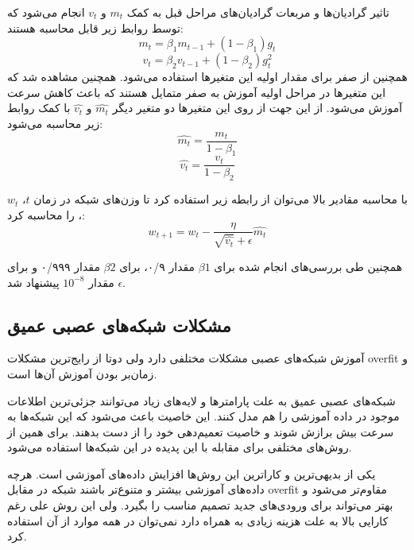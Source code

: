 تاثیر گرادیان‌ها و مربعات گرادیان‌های مراحل قبل به کمک $m_t$ و $v_t$ انجام
می‌شود که توسط روابط زیر قابل محاسبه هستند:
\begin{equation}
    m_t = \beta_1 m_{t-1} + (1 - \beta_1) g_t
\end{equation}
\begin{equation}
    v_t = \beta_2 v_{t-1} + (1 - \beta_2) g_t^2
\end{equation}
همچنین از صفر برای مقدار اولیه این متغیرها استفاده می‌شود. همچنین مشاهده شد که
این متغیرها در مراحل اولیه آموزش به صفر متمایل هستند که باعث کاهش سرعت آموزش
می‌شود. از این جهت از روی این متغیرها دو متغیر دیگر $\hat{m_t}$ و $\hat{v_t}$ با
کمک روابط زیر محاسبه می‌شود:
\begin{equation}
    \hat{m_t} = \frac{m_t}{1 - \beta_1}
\end{equation}
\begin{equation}
    \hat{v_t} = \frac{v_t}{1 - \beta_2}
\end{equation}

با محاسبه مقادیر بالا می‌توان از رابطه زیر استفاده کرد تا وزن‌های شبکه در زمان
$t$، $w_t$، را محاسبه کرد:
\begin{equation}
    w_{t+1} = w_{t} - \frac{\eta}{\sqrt{\hat{v_t}} + \epsilon} \hat{m_t}
\end{equation}

همچنین طی بررسی‌های انجام شده برای $\beta1$ مقدار ۰/۹، برای $\beta2$ مقدار ۰/۹۹۹
و برای $\epsilon$ مقدار $10^{-8}$ پیشنهاد شد.

\subsection{مشکلات شبکه‌های عصبی عمیق}
آموزش شبکه‌های عصبی مشکلات مختلفی دارد ولی دوتا از رایج‌ترین مشکلات \gls{overfit} و
زمان‌بر بودن آموزش آن‌ها است.

شبکه‌های عصبی عمیق به علت پارامترها و لایه‌های زیاد می‌توانند جزئی‌ترین اطلاعات
موجود در داده آموزشی را هم مدل کنند. این خاصیت باعث می‌شود که این شبکه‌ها به
سرعت بیش برازش شوند و خاصیت تعمیم‌دهی خود را از دست بدهند. برای همین از روش‌های
مختلفی برای مقابله با این پدیده در این شبکه‌ها استفاده می‌شود.

یکی از بدیهی‌ترین و کاراترین این روش‌ها افزایش داده‌های آموزشی است. هرچه
داده‌های آموزشی بیشتر و متنوع‌تر باشند شبکه در مقابل \gls{overfit} مقاوم‌تر می‌شود و
بهتر می‌تواند برای ورودی‌های جدید تصمیم مناسب را بگیرد. ولی این روش علی رغم
کارایی بالا به علت هزینه زیادی به همراه دارد نمی‌توان در همه موارد از آن استفاده
کرد.

